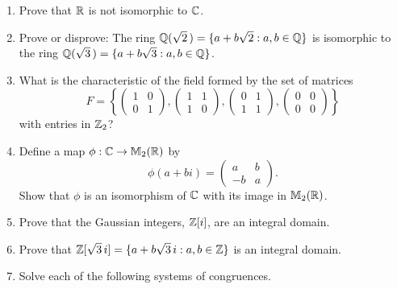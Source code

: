 {\begin{enumerate}
 
\bf\item\rm
Prove that ${\Bbb R}$ is not isomorphic to ${\Bbb C}$.
 
 
\bf\item\rm
Prove or disprove: The ring ${\Bbb Q}( \sqrt{2}\, ) = \{ a + b \sqrt{2}
: a, b \in {\Bbb Q} \}$ is isomorphic to the ring ${\Bbb Q}( \sqrt{3}\,
) = \{a + b \sqrt{3} : a, b \in {\Bbb Q}  \}$.
 
 
\bf\item\rm
What is the characteristic of the field formed by the set of matrices
\[
F
=
\left\{
\left(
\begin{array}{cc}
1 & 0 \\
0 & 1
\end{array}
\right),
\left(
\begin{array}{cc}
1 & 1 \\
1 & 0
\end{array}
\right),
\left(
\begin{array}{cc}
0 & 1 \\
1 & 1
\end{array}
\right),
\left(
\begin{array}{cc}
0 & 0 \\
0 & 0
\end{array}
\right)
\right\}
\]
with entries in ${\Bbb Z}_2$?
 
 
\bf\item\rm
Define a map $\phi : {\Bbb C} \rightarrow {\Bbb M}_2 ({\Bbb R})$ by
\[
\phi( a + bi) =
\left(
\begin{array}{cc}
a & b \\
-b & a
\end{array}
\right).
\]
Show that $\phi$ is an isomorphism of ${\Bbb C}$ with its image in
${\Bbb M}_2 ({\Bbb R})$.
 
 
 
\bf\item\rm
Prove that the Gaussian integers, ${\Bbb Z}[i ]$, are an integral
domain. 
 
 
 
\bf\item\rm
Prove that  ${\Bbb Z}[ \sqrt{3}\, i ] = \{ a + b \sqrt{3}\, i : a, b \in
{\Bbb Z} \}$ is an integral domain.
 
 
\bf\item\rm
Solve each of the following systems of congruences.
 
\vspace{3pt}        %
 
\hspace{-7pt}
\begin{minipage}[t]{4.6in}
\noindent
\begin{minipage}[t]{2.25in}
\begin{itemize}
 

\end{itemize}
\end{minipage}
\end{minipage}
\end{enumerate}}
